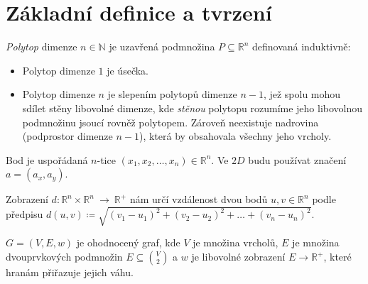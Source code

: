 \chapter*{Základní definice a tvrzení}
\label{sec:zakladni-pojmy}

\begin{definition}[Polytop]
    \emph{Polytop} dimenze $n \in \mathbb{N}$ je uzavřená podmnožina $P \subseteq \mathbb{R}^{n}$ definovaná induktivně:
    \begin{itemize}
        \item Polytop dimenze $1$ je úsečka.
        \item Polytop dimenze $n$ je slepením polytopů dimenze $n-1$, jež spolu mohou
            sdílet stěny libovolné dimenze, kde \emph{stěnou} polytopu rozumíme jeho
            libovolnou podmnožinu jsoucí rovněž polytopem.
            Zároveň neexistuje nadrovina (podprostor dimenze $n - 1$), která by obsahovala všechny jeho vrcholy.
            \autocite{adamklepacDefinicePolytopu2024}
    \end{itemize}
    
\end{definition}

\begin{definition}[Bod]
    \label{definice:bod}
    Bod je uspořádaná $n$-tice $(x_1, x_2, \ldots, x_n) \in \mathbb{R}^n$. Ve $2D$ budu používat značení $a=(a_x, a_y)$.
\end{definition}

\begin{definition}[Vzdálenost]
    \label{definice:vzdalenost}
    Zobrazení $d: \mathbb{R}^n\times \mathbb{R}^n~\rightarrow~\mathbb{R}^+$ nám určí vzdálenost dvou bodů $u, v \in \mathbb{R}^n$
    podle předpisu $d(u, v) \coloneqq \sqrt{(v_1-u_1)^2+(v_2-u_2)^2+\ldots+(v_n-u_n)^2}$.
\end{definition}

\begin{definition}
    \label{definice:ohodnoceny_graf}
    $G = (V, E, w)$ je ohodnocený graf, kde $V$ je množina vrcholů, $E$ je množina dvouprvkových podmnožin $E \subseteq \binom{V}{2}$ a $w$ je libovolné zobrazení $E \rightarrow \mathds{R}^+$, které hranám přiřazuje jejich váhu.
\end{definition}

